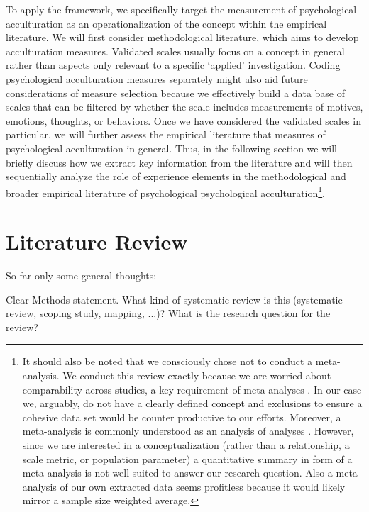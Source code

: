 \documentclass[nobib]{tufte-handout}
\begin{document}
To apply the framework, we specifically target the measurement of psychological acculturation as an operationalization of the concept within the empirical literature. We will first consider methodological literature, which aims to develop acculturation measures. Validated scales usually focus on a concept in general rather than aspects only relevant to a specific `applied' investigation. Coding psychological acculturation measures separately might also aid future considerations of measure selection because we effectively build a data base of scales that can be filtered by whether the scale includes measurements of motives, emotions, thoughts, or behaviors. Once we have considered the validated scales in particular, we will further assess the empirical literature that measures of psychological acculturation in general. Thus, in the following section we will briefly discuss how we extract key information from the literature and will then sequentially analyze the role of experience elements in the methodological and broader empirical literature of psychological psychological acculturation\footnote{It should also be noted that we consciously chose not to conduct a meta-analysis. We conduct this review exactly because we are worried about comparability across studies, a key requirement of meta-analyses \citep{Pogue1998}. In our case we, arguably, do not have a clearly defined concept and exclusions to ensure a cohesive data set would be counter productive to our efforts. Moreover, a meta-analysis is commonly understood as an analysis of analyses \citep{Glass1976}. However, since we are interested in a conceptualization (rather than a relationship, a scale metric, or population parameter) a quantitative summary in form of a meta-analysis is not well-suited to answer our research question. Also a meta-analysis of our own extracted data seems profitless because it would likely mirror a sample size weighted average.}.

\newpage
\section{Literature Review}

So far only some general thoughts:

Clear Methods statement. What kind of systematic review is this (systematic review, scoping study, mapping, ...)? What is the research question for the review?
\end{document}
